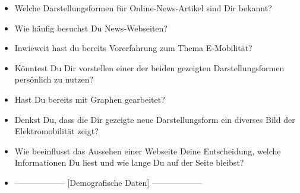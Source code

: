 {\begin{itemize}[]
    \item {} Welche Darstellungsformen für Online-News-Artikel sind Dir bekannt?
    \item {} Wie häufig besuchst Du News-Webseiten?
    \item {} Inwieweit hast du bereits Vorerfahrung zum Thema E-Mobilität?
    \item {} Könntest Du Dir vorstellen einer der beiden gezeigten Darstellungsformen persönlich zu nutzen?
    \item {} Hast Du bereits mit Graphen gearbeitet?
    \item {} Denkst Du, dass die Dir gezeigte neue Darstellungsform ein diverses Bild der Elektromobilität zeigt?
    \item {} Wie beeinflusst das Aussehen einer Webseite Deine Entscheidung, welche Informationen Du liest und wie lange Du auf der Seite bleibst?
    \item {------------------} [Demografische Daten] {------------------}
\end{itemize}}
\nolinenumbers
